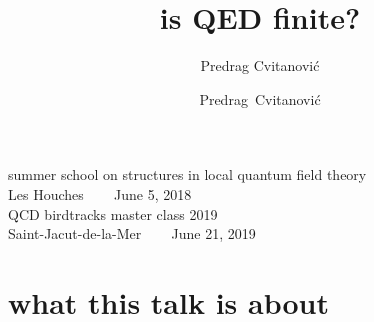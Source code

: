 



\usepackage{booktabs} %
\usepackage[font=scriptsize, labelfont=bf]{caption}
\usepackage[
    backend=biber,  %
    sorting=nyt,
    style=numeric, %
    natbib=true,
    style=phys, %
    biblabel= brackets, %
    articletitle=false, %
    pageranges = true , %
    sortlocale=en_US,
    firstinits=true,
    url=false, %
    doi=false, %
    eprint=false
]{biblatex}


\renewcommand{\Ssym}[1]{{\ensuremath{m_{#1}}}}    %




\title{
{\huge is QED finite?}
}
\author{Predrag Cvitanovi\'c}
\author[Cvitanovi\'c]
{
  \textcolor{green!50!black}{
  {Predrag~Cvitanovi\'c
  }	%
  }
}
\institute
{
summer school on structures in local quantum field theory
\\
Les Houches ~~~ June 5, 2018\\[1ex]
QCD birdtracks master class 2019\\Saint-Jacut-de-la-Mer ~~~ June 21, 2019
 }
\date{} %

\begin{frame}
  \titlepage
\end{frame}

\section[what this talk is about]
 {what this talk is about}

